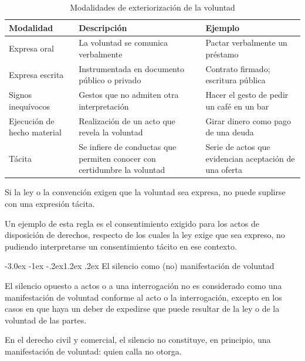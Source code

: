 \documentclass[12pt,oneside]{book}
\makeatletter
\renewcommand\section{\@startsection{section}{1}{\z@}%
  {-3.0ex \@plus -1ex \@minus -.2ex}{1.2ex \@plus .2ex}%
  {\normalfont\large\bfseries\color{acento}}}
\makeatother
\begin{document}
\begin{table}[H]
\centering
\caption{Modalidades de exteriorización de la voluntad}
\begin{tabularx}{\textwidth}{l X X}
\toprule
\textbf{Modalidad} & \textbf{Descripción} & \textbf{Ejemplo} \\
\midrule
Expresa oral & La voluntad se comunica verbalmente & Pactar verbalmente un préstamo \\
Expresa escrita & Instrumentada en documento público o privado & Contrato firmado; escritura pública \\
Signos inequívocos & Gestos que no admiten otra interpretación & Hacer el gesto de pedir un café en un bar \\
Ejecución de hecho material & Realización de un acto que revela la voluntad & Girar dinero como pago de una deuda \\
Tácita & Se infiere de conductas que permiten conocer con certidumbre la voluntad & Serie de actos que evidencian aceptación de una oferta \\
\bottomrule
\end{tabularx}
\end{table}

\begin{definicion}
Si la ley o la convención exigen que la voluntad sea expresa, no puede suplirse con una expresión tácita.
\end{definicion}

Un ejemplo de esta regla es el consentimiento exigido para los actos de disposición de derechos, respecto de los cuales la ley exige que sea expreso, no pudiendo interpretarse un consentimiento tácito en ese contexto.

\section{El silencio como (no) manifestación de voluntad}

\begin{definicion}
El silencio opuesto a actos o a una interrogación no es considerado como una manifestación de voluntad conforme al acto o la interrogación, excepto en los casos en que haya un deber de expedirse que puede resultar de la ley o de la voluntad de las partes.
\end{definicion}

En el derecho civil y comercial, el silencio no constituye, en principio, una manifestación de voluntad: quien calla no otorga.
\end{document}
